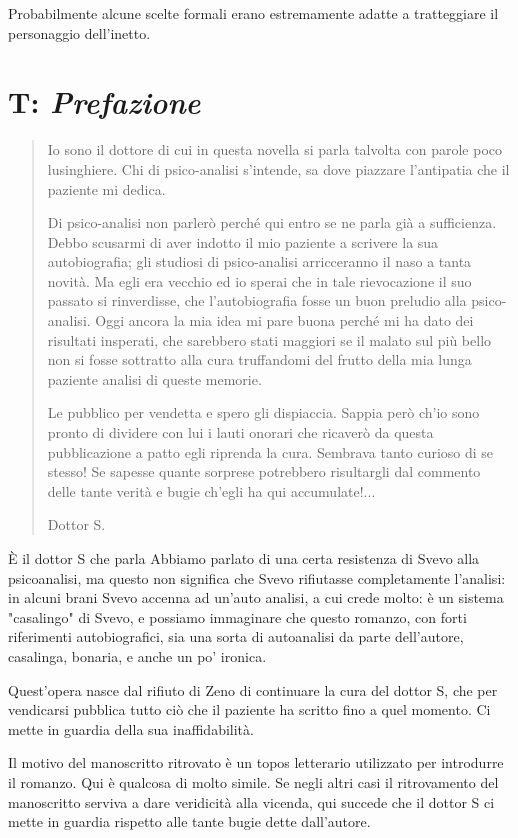 \documentclass[a4paper, twoside, titlepage]{book}
\begin{document}
Probabilmente alcune scelte formali erano estremamente adatte a tratteggiare il personaggio dell'inetto.

\section{T: \textit{Prefazione}}

\begin{quotation}
Io sono il dottore di cui in questa novella si parla talvolta con parole poco lusinghiere. Chi di psico-analisi s’intende, sa dove piazzare l’antipatia che il paziente mi dedica.

Di psico-analisi non parlerò perché qui entro se ne parla già a sufficienza. Debbo scusarmi di aver indotto il mio paziente a scrivere la sua autobiografia; gli studiosi di psico-analisi arricceranno il naso a tanta novità. Ma egli era vecchio ed io sperai che in tale rievocazione il suo passato si rinverdisse, che l’autobiografia fosse un buon preludio alla psico-analisi. Oggi ancora la mia idea mi pare buona perché mi ha dato dei risultati insperati, che sarebbero stati maggiori se il malato sul più bello non si fosse sottratto alla cura truffandomi del frutto della mia lunga paziente analisi di queste memorie.

Le pubblico per vendetta e spero gli dispiaccia. Sappia però ch'io sono pronto di dividere con lui i lauti onorari che ricaverò da questa pubblicazione a patto egli riprenda la cura. Sembrava tanto curioso di se stesso! Se sapesse quante sorprese potrebbero risultargli dal commento delle tante verità e bugie ch'egli ha qui accumulate!...

Dottor S.
\end{quotation}

È il dottor S che parla
Abbiamo parlato di una certa resistenza di Svevo alla psicoanalisi, ma questo non significa che Svevo rifiutasse completamente l'analisi: in alcuni brani Svevo accenna ad un'auto analisi, a cui crede molto: è un sistema "casalingo" di Svevo, e possiamo immaginare che questo romanzo, con forti riferimenti autobiografici, sia una sorta di autoanalisi da parte dell'autore, casalinga, bonaria, e anche un po' ironica.

Quest'opera nasce dal rifiuto di Zeno di continuare la cura del dottor S, che per vendicarsi pubblica tutto ciò che il paziente ha scritto fino a quel momento.
Ci mette in guardia della sua inaffidabilità.

Il motivo del manoscritto ritrovato è un topos letterario utilizzato per introdurre il romanzo. Qui è qualcosa di molto simile.
Se negli altri casi il ritrovamento del manoscritto serviva a dare veridicità alla vicenda, qui succede che il dottor S ci mette in guardia rispetto alle tante bugie dette dall'autore.
\end{document}
